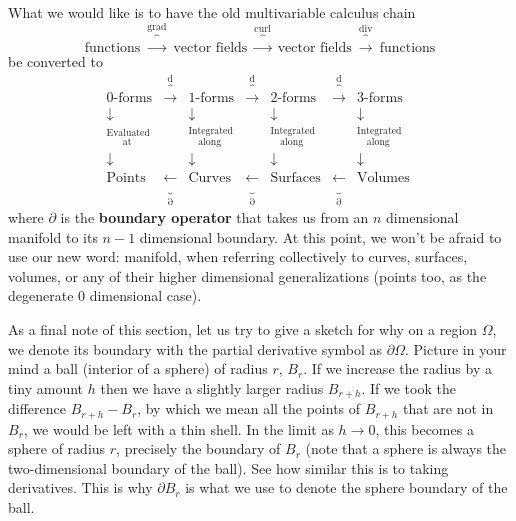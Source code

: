 \documentclass[../master.tex]{subfiles}
\begin{document}
	What we would like is to have the old multivariable calculus chain
	\begin{equation*}
		\text{functions} ~ \overbrace{\longrightarrow}^{\text{grad}}
		~ \text{vector fields} ~ \overbrace{\longrightarrow}^{\text{curl}}
		~ \text{vector fields} ~ \overbrace{\longrightarrow}^{\text{div}} 
		~ \text{functions} 
	\end{equation*}
	be converted to
	\begin{equation*}
		~~~~~~
		\begin{matrix}
			\text{0-forms} & \overbrace{\longrightarrow}^\mathrm d & 
			\text{1-forms} & \overbrace{\longrightarrow}^\mathrm d & 
			\text{2-forms} & \overbrace{\longrightarrow}^\mathrm d & 
			\text{3-forms}  \\
			\downarrow & & \downarrow & & \downarrow & & \downarrow \\
			^{\text{Evaluated}}_{\text{~~~~~at}} & & 
			^{\text{Integrated}}_{\text{~~~along}} & &
			^{\text{Integrated}}_{\text{~~~along}} & &
			^{\text{Integrated}}_{\text{~~~along}} & &\\
			\downarrow & & \downarrow & & \downarrow & & \downarrow \\
			\text{Points} & \underbrace{\longleftarrow}_\partial & 
			\text{Curves} & \underbrace{\longleftarrow}_\partial & 
			\text{Surfaces} & \underbrace{\longleftarrow}_\partial & \text{Volumes}
			
		\end{matrix}
	\end{equation*}
	where $\partial$ is the \textbf{boundary operator} that takes us from an $n$ dimensional manifold to its $n-1$ dimensional boundary. At this point, we won't be afraid to use our new word: manifold, when referring collectively to curves, surfaces, volumes, or any of their higher dimensional generalizations (points too, as the degenerate 0 dimensional case). 
	
	As a final note of this section, let us try to give a sketch for why on a region $\Omega$, we denote its boundary with the partial derivative symbol as $\partial \Omega$. Picture in your mind a ball (interior of a sphere) of radius $r$,  $B_r$. If we increase the radius by a tiny amount $h$ then we have a slightly larger radius $B_{r+h}$. If we took the difference $B_{r+h} - B_r$, by which we mean all the points of $B_{r+h}$ that are not in $B_r$, we would be left with a thin shell. In the limit as $h \rightarrow 0$, this becomes a sphere of radius $r$, precisely the boundary of $B_r$ (note that a sphere is always the two-dimensional boundary of the ball). See how similar this is to taking derivatives. This is why $\partial B_r$ is what we use to denote the sphere boundary of the ball. 
	
\end{document}
